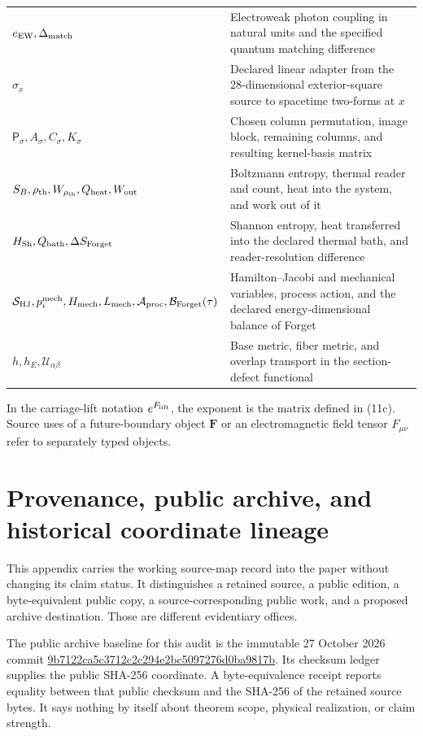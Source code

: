 \begin{longtable}[]{@{}
  >{\raggedright\arraybackslash}p{}
  >{\raggedright\arraybackslash}p{}@{}}
\(e_{\rm EW},\Delta_{\rm match}\) & Electroweak photon coupling in natural units and the specified quantum matching difference \\
\(\sigma_x\) & Declared linear adapter from the 28-dimensional exterior-square source to spacetime two-forms at \(x\) \\
\(\mathsf P_\sigma,A_\sigma,C_\sigma,K_\sigma\) & Chosen column permutation, image block, remaining columns, and resulting kernel-basis matrix \\
\(S_B,\rho_{\rm th},W_{\rho_{\rm th}},Q_{\rm heat},W_{\rm out}\) & Boltzmann entropy, thermal reader and count, heat into the system, and work out of it \\
\(H_{\rm Sh},Q_{\rm bath},\Delta S_{\rm Forget}\) & Shannon entropy, heat transferred into the declared thermal bath, and reader-resolution difference \\
\(\mathcal S_{\rm HJ},p_i^{\rm mech},H_{\rm mech},L_{\rm mech},\mathcal A_{\rm proc},\mathcal B_{\rm Forget}(\tau)\) & Hamilton--Jacobi and mechanical variables, process action, and the declared energy-dimensional balance of Forget \\
\(h,h_E,\mathcal U_{\alpha\beta}\) & Base metric, fiber metric, and overlap transport in the section-defect functional \\
\end{longtable}

In the carriage-lift notation \(e^{F_{\rm lift}}\), the exponent is the matrix defined in (11c). Source uses of a future-boundary object \(\mathbf F\) or an electromagnetic field tensor \(F_{\mu\nu}\) refer to separately typed objects.

\hypertarget{appendix-b.-provenance-public-archive-and-historical-coordinate-lineage}{%
\section{Provenance, public archive, and historical coordinate lineage}\label{appendix-b.-provenance-public-archive-and-historical-coordinate-lineage}}

This appendix carries the working source-map record into the paper without changing its claim status. It distinguishes a retained source, a public edition, a byte-equivalent public copy, a source-corresponding public work, and a proposed archive destination. Those are different evidentiary offices.

The public archive baseline for this audit is the immutable 27 October 2026 commit \href{https://github.com/Coppalini-Architecture/coppalini-architecture/tree/9b7122ca5c3712c2c294e2bc5097276d0ba9817b}{9b7122ca5c3712c2c294e2bc5097276d0ba9817b}. Its checksum ledger supplies the public SHA-256 coordinate. A byte-equivalence receipt reports equality between that public checksum and the SHA-256 of the retained source bytes. It says nothing by itself about theorem scope, physical realization, or claim strength.

